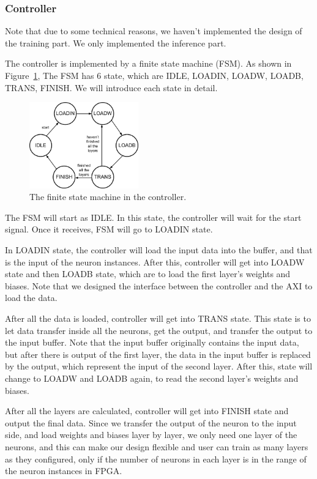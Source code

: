 \documentclass[conference]{IEEEtran}
\begin{document}
\subsubsection{Controller}

Note that due to some technical reasons, we haven't implemented the design of the training part. We only implemented the inference part. 

The controller is implemented by a finite state machine (FSM). As shown in Figure~\ref{fig:fsm}, The FSM has 6 state, which are IDLE, LOADIN, LOADW, LOADB, TRANS, FINISH. We will introduce each state in detail.

\begin{figure}[!hbt]
	\centering
	\includegraphics[width=0.42\textwidth]{fsm.png}
	\caption{The finite state machine in the controller.}
	\label{fig:fsm}
\end{figure}

The FSM will start as IDLE. In this state, the controller will wait for the start signal. Once it receives, FSM will go to LOADIN state.

In LOADIN state, the controller will load the input data into the buffer, and that is the input of the neuron instances. After this, controller will get into LOADW state and then LOADB state, which are to load the first layer's weights and biases. Note that we designed the interface between the controller and the AXI to load the data.

After all the data is loaded, controller will get into TRANS state. This state is to let data transfer inside all the neurons, get the output, and transfer the output to the input buffer. Note that the input buffer originally contains the input data, but after there is output of the first layer, the data in the input buffer is replaced by the output, which represent the input of the second layer. After this, state will change to LOADW and LOADB again, to read the second layer's weights and biases.

After all the layers are calculated, controller will get into FINISH state and output the final data. Since we transfer the output of the neuron to the input side, and load weights and biases layer by layer, we only need one layer of the neurons, and this can make our design flexible and user can train as many layers as they configured, only if the number of neurons in each layer is in the range of the neuron instances in FPGA.
\end{document}
